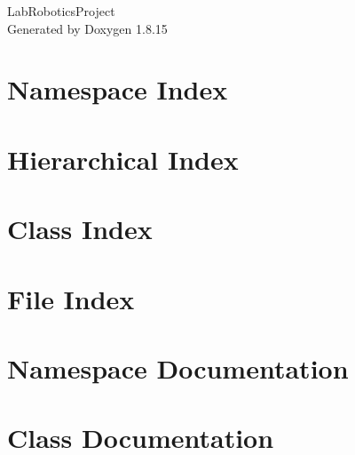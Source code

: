 \let\mypdfximage\pdfximage\def\pdfximage{\immediate\mypdfximage}\documentclass[twoside]{book}
\newcommand{\+}{\discretionary{\mbox{\scriptsize$\hookleftarrow$}}{}{}}
\newcommand{\clearemptydoublepage}{%
  \newpage{\pagestyle{empty}\cleardoublepage}%
}
\begin{document}
\hypersetup{pageanchor=false,
             bookmarksnumbered=true,
             pdfencoding=unicode
            }
\begin{titlepage}
\vspace*{7cm}
\begin{center}%
{\Large Lab\+Robotics\+Project }\\
\vspace*{1cm}
{\large Generated by Doxygen 1.8.15}\\
\end{center}
\end{titlepage}
\clearemptydoublepage
{}
\tableofcontents
\clearemptydoublepage
{}
\hypersetup{pageanchor=true}

\chapter{Namespace Index}

\chapter{Hierarchical Index}

\chapter{Class Index}

\chapter{File Index}

\chapter{Namespace Documentation}




\chapter{Class Documentation}





































\end{document}
